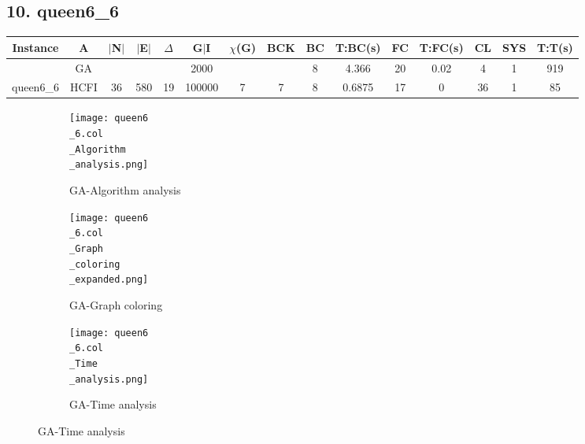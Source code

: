 \documentclass[10pt]{article}
\begin{document}
\subsection*{\hspace{0,9073976cm} 10. queen6\_6}
\begin{table}[H]
\centering
\begin{tabular}{|c|c|c|c|c|c|c|c|c|c|c|c|c|c|c|}
\hline
Instance& A &$|$N$|$ & $|$E$|$ & $\Delta$ & G$|$I & $\chi$(G) &BCK&BC & T:BC(s) & FC & T:FC(s) & CL & SYS & T:T(s) \\ \hline \hline
&GA&       &                   &                     &2000         &     \cellcolor{yellow} & {\cellcolor{yellow}}& {{\cellcolor{green}8}}
&4.366   &20        & 0.02                  &4                    & 1         & 919       \\ \cline{2-2} \cline{6-6} \cline{9-15}
 \multirow{-2}{*}{queen6\_6} &HCFI   &\multirow{-2}{*}{36}   &\multirow{-2}{*}{580}     &\multirow{-2}{*}{19}     &100000     &\multirow{-2}{*}{\cellcolor{yellow}7}      & \multirow{-2}{*}{\cellcolor{yellow}7}    &{\cellcolor{green}8}     &0.6875         &17    & 0        &36    &1     &       85 \\ \hline 
\end{tabular}
\end{table}

\graphicspath{{./Core1/Solutions/GA/queen6\_6.col}}
\begin{figure}[H]
\begin{subfigure}{.33\textwidth}
  \centering
  \texttt{[image: queen6\\\_6.col\\\_Algorithm\\\_analysis.png]}
  \caption{GA-Algorithm analysis}
   \label{fig:subfig1}
\end{subfigure}%
\begin{subfigure}{.33\textwidth}
  \centering
  \texttt{[image: queen6\\\_6.col\\\_Graph\\\_coloring\\\_expanded.png]}
  \caption{GA-Graph coloring}
  \label{fig:subfig2}
\end{subfigure}
\begin{subfigure}{.33\textwidth}
  \centering
  \texttt{[image: queen6\\\_6.col\\\_Time\\\_analysis.png]}
  \caption{GA-Time analysis}
  \end{subfigure}
\end{figure}
\end{document}
